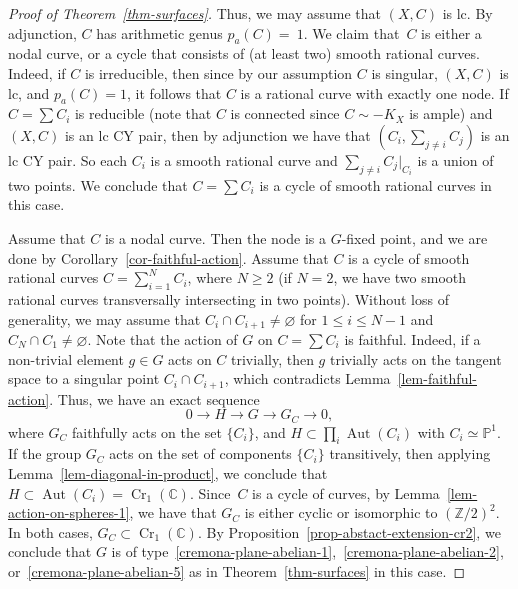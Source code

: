 \documentclass[11pt]{amsart}
\numberwithin{equation}{section}
\theoremstyle{definition}
\theoremstyle{remark}
\let\emptyset\varnothing
\newcommand{\lra}{\longrightarrow}
\DeclareMathOperator{\Cr}{Cr}
\DeclareMathOperator{\Aut}{Aut}
\begin{document}
\begin{proof}[Proof of Theorem~\ref{thm-surfaces}]
Thus, we may assume that $(X, C)$ is lc. By adjunction, $C$ has arithmetic genus $p_a(C)=~1$. 
We claim that~$C$ is either a nodal curve, or a cycle that consists of (at least two) smooth rational curves. Indeed, if $C$ is irreducible, then since by our assumption $C$ is singular, $(X, C)$ is lc, and $p_a(C)=1$, it follows that $C$ is a rational curve with exactly one node. If $C=\sum C_i$ is reducible (note that $C$ is connected since $C\sim -K_X$ is ample) and $(X, C)$ is an lc CY pair, then by adjunction we have that $(C_i, \sum_{j\neq i} C_j)$ is an lc CY pair. So each $C_i$ is a smooth rational curve and $\sum_{j\neq i} C_j|_{C_i}$ is a union of two points. We conclude that $C=\sum C_i$ is a cycle of smooth rational curves in this case. 

Assume that $C$ is a nodal curve. Then the node is a $G$-fixed point, and we are done by Corollary~\ref{cor-faithful-action}.  Assume that $C$ is a cycle of smooth rational curves $C=\sum_{i=1}^N C_i$, where $N\geq 2$ (if $N=2$, we have two smooth rational curves transversally intersecting in two points).  Without loss of generality, we may assume that $C_i\cap C_{i+1}\neq \emptyset$ for $1\leq i\leq N-1$ and $C_N\cap C_{1}\neq \emptyset$.  Note that the action of $G$ on $C=\sum C_i$ is faithful. Indeed, if a non-trivial element $g\in G$ acts on $C$ trivially, then $g$ trivially acts on the tangent space to a singular point $C_i\cap C_{i+1}$, which contradicts Lemma~\ref{lem-faithful-action}. Thus, we have an exact sequence
\[
0\lra H \lra G \lra G_{C} \lra 0, 
\]
where $G_{C}$ faithfully acts on the set $\{C_i\}$, and $H\subset \prod_i \Aut(C_i)$ with $C_i\simeq \mathbb{P}^1$. 
If the group $G_{C}$ acts on the set of components $\{C_i\}$ transitively, then applying Lemma~\ref{lem-diagonal-in-product}, we conclude that $H\subset \Aut(C_i)=\Cr_1(\mathbb{C})$. 
Since~$C$ is a cycle of curves, by Lemma~\ref{lem-action-on-spheres-1}, we have that $G_C$ is either cyclic or isomorphic to $(\mathbb{Z}/2)^2$. In both cases, $G_C\subset \Cr_1(\mathbb{C})$. By Proposition~\ref{prop-abstact-extension-cr2}, we conclude that $G$ is of type~\eqref{cremona-plane-abelian-1},~\eqref{cremona-plane-abelian-2}, or~\eqref{cremona-plane-abelian-5} as in Theorem~\ref{thm-surfaces} in this case.


\end{proof}
\end{document}
